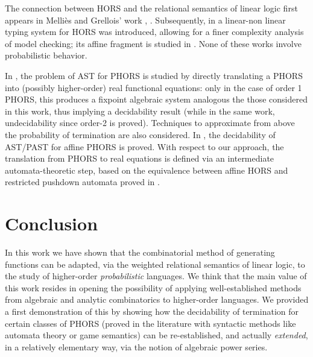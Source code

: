 The connection between HORS and the relational semantics of linear logic first appears in  Melliès and Grellois' work \cite{DBLP:conf/csl/GrelloisM15}, \cite{DBLP:conf/mfcs/GrelloisM15}. Subsequently, in \cite{DBLP:journals/pacmpl/ClairambaultGM18} a linear-non linear typing system for HORS was introduced, allowing for a finer complexity analysis of model checking; its affine fragment is studied in \cite{DBLP:conf/mfcs/ClairambaultM19}. None of these works involve probabilistic behavior.


In \cite{DBLP:journals/lmcs/KobayashiLG20}, the problem of AST for PHORS is studied by directly translating a PHORS into (possibly higher-order) real functional equations: only in the case of order 1 PHORS, this produces a fixpoint algebraic system analogous the those considered in this work, thus implying a decidability result (while in the same work, undecidability since order-2 is proved). Techniques to approximate from above the probability of termination are also considered. In \cite{DBLP:conf/lics/LiMO22}, the decidability of AST/PAST for affine PHORS is proved. With respect to our approach, the translation from PHORS to real equations is defined via an intermediate automata-theoretic step, based on the equivalence between affine HORS and restricted pushdown automata proved in \cite{DBLP:conf/mfcs/ClairambaultM19}.



\section{Conclusion}

In this work we have shown that the combinatorial method of generating functions can be adapted, via the weighted relational semantics of linear logic, to the study of higher-order \emph{probabilistic} languages. 
We think that the main value of this work resides in opening the possibility of applying well-established methods from algebraic and analytic combinatorics to higher-order languages. We provided a first demonstration of this by showing how  the decidability of termination for certain classes of PHORS (proved in the literature with syntactic methods like automata theory or game semantics) can be re-established, and actually \emph{extended}, in a relatively elementary way, via the notion of algebraic power series.

